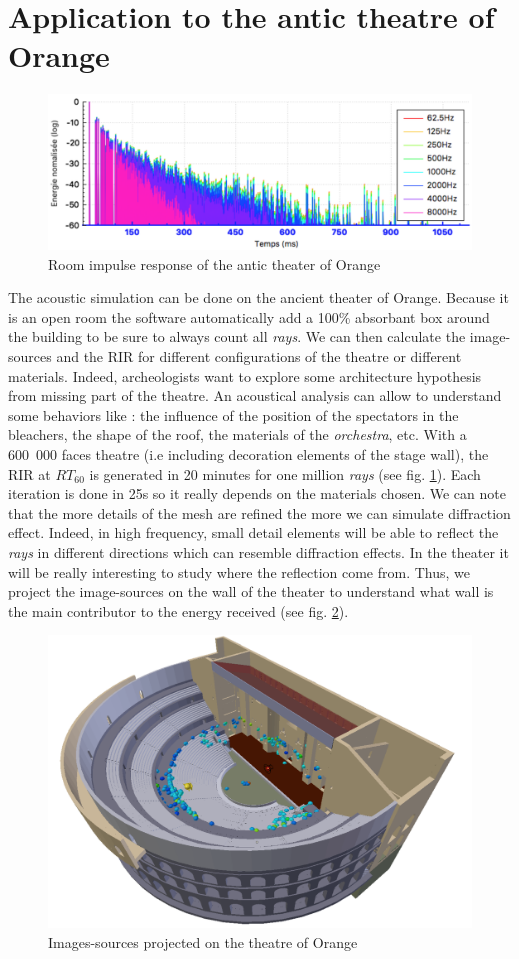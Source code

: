 \documentclass[AMA,STIX1COL]{WileyNJD-v2}
\begin{document}
\section{Application to the antic theatre of Orange}\label{sec7}

\begin{figure}[h]
\centering
	\includegraphics[width=0.7\linewidth]{rir}
	\caption{Room impulse response of the antic theater of Orange}
	\label{rir}
\end{figure}

The acoustic simulation can be done on the ancient theater of Orange. Because it is an open room the software automatically add a 100\% absorbant box around the building to be sure to always count all \textit{rays}. We can then calculate the image-sources and the RIR for different configurations of the theatre or different materials. Indeed, archeologists want to explore some architecture hypothesis from missing part of the theatre. An acoustical analysis can allow to understand some behaviors like : the influence of the position of the spectators in the bleachers, the shape of the roof, the materials of the \textit{orchestra}, etc. With a 600~000 faces theatre (i.e including decoration elements of the stage wall), the RIR at $RT_{60}$ is generated in 20 minutes for one million \textit{rays} (see fig. \ref{rir}). Each iteration is done in 25s so it really depends on the materials chosen. We can note that the more details of the mesh are refined the more we can simulate diffraction effect. Indeed, in high frequency, small detail elements will be able to reflect the \textit{rays} in different directions which can resemble diffraction effects. In the theater it will be really interesting to study where the reflection come from. Thus, we project the image-sources on the wall of the theater to understand what wall is the main contributor to the energy received (see fig. \ref{theatre}).

\begin{figure}[h]
\centering
	\includegraphics[width=0.7\linewidth]{theatre}
	\caption{Images-sources projected on the theatre of Orange}
	\label{theatre}
\end{figure}
\end{document}
